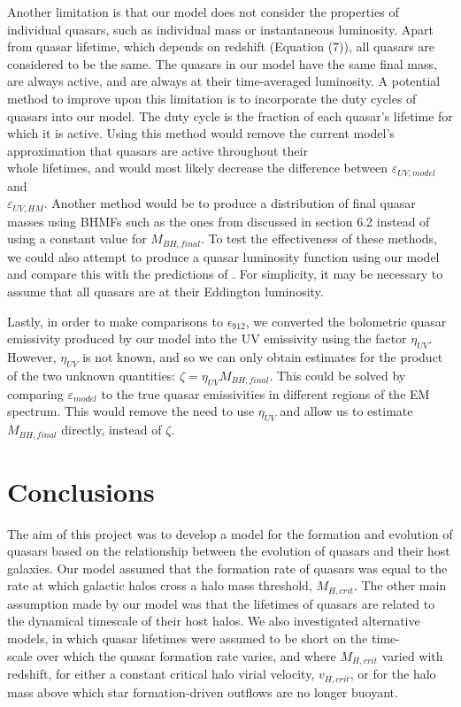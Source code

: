 \documentclass[12pt]{article}%
\begin{document}
Another limitation is that our model does not consider the properties of individual quas\-ars, such as individual mass or instantaneous luminosity. Apart from quasar lifetime, which depends on redshift (Equation (7)), all quasars are considered to be the same. The quasars in our model have the same final mass, are always active, and are always at their time-averaged luminosity. A potential method to improve upon this limitation is to incorporate the duty cycles of quasars into our model. The duty cycle is the fraction of each quasar's lifetime for which it is active. Using this method would remove the current model's approximation that quasars are active throughout their\\whole lifetimes, and would most likely decre\-ase the difference between $\varepsilon_{UV,model}$ and\\$\varepsilon_{UV,HM}$. Another method would be to produce a distribution of final quasar masses using BHMFs such as the ones from \citeauthor{BH_mass_fns} discussed in section 6.2 instead of using a constant value for $M_{BH,final}$. To test the effectiveness of these methods, we could also attempt to produce a quasar luminosity function using our model and compare this with the predictions of \cite{Hopkins}. For simplicity, it may be necessary to assume that all quasars are at their Eddington luminosity.\par

Lastly, in order to make comparisons to $\epsilon_{912}$, we converted the bolometric quasar emissivity produced by our model into the UV emissivity using the factor $\eta_{UV}$. However, $\eta_{UV}$ is not known, and so we can only obtain estimates for the product of the two unknown quantities: $\zeta=\eta_{UV}M_{BH,final}$. This could be solved by comparing $\varepsilon_{model}$ to the true quasar emissivities in different regions of the EM spectrum. This would remove the need to use $\eta_{UV}$ and allow us to estimate $M_{BH,final}$ directly, instead of $\zeta$.

\section{Conclusions}

The aim of this project was to develop a model for the formation and evolution of quasars based on the relationship between the evolution of quasars and their host galaxies. Our model assumed that the formation rate of quasars was equal to the rate at which galactic halos cross a halo mass threshold, $M_{H,crit}$. The other main assumption made by our model was that the lifetimes of quasars are related to the dynamical timescale of their host halos. We also investigated alternative models, in which quasar lifetimes were assumed to be short on the time-\\scale over which the quasar formation rate varies, and where $M_{H,crit}$ varied with redshift, for either a constant critical halo virial velocity, $v_{H,crit}$, or for the halo mass above which star formation-driven outflows are no longer buoyant.\par
\end{document}
